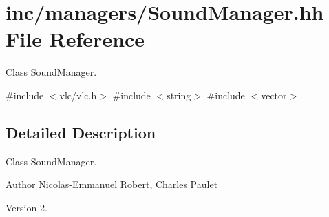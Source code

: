 \hypertarget{SoundManager_8hh}{}\section{inc/managers/\+Sound\+Manager.hh File Reference}
\label{SoundManager_8hh}


Class Sound\+Manager.  


{\ttfamily \#include $<$vlc/vlc.\+h$>$}\newline
{\ttfamily \#include $<$string$>$}\newline
{\ttfamily \#include $<$vector$>$}\newline


\subsection{Detailed Description}
Class Sound\+Manager. 

\begin{DoxyAuthor}{Author}
Nicolas-\/\+Emmanuel Robert, Charles Paulet 
\end{DoxyAuthor}
\begin{DoxyVersion}{Version}
2. 
\end{DoxyVersion}
